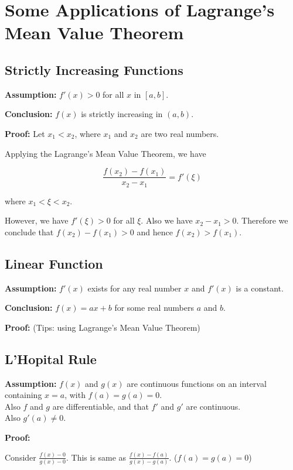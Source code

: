 \section{Some Applications of Lagrange's Mean Value Theorem}

\subsection{Strictly Increasing Functions}

\textbf{Assumption:} $f'(x) > 0$ for all $x$ in $[a, b]$.

\textbf{Conclusion:} $f(x)$ is strictly increasing in $(a, b)$.

\textbf{Proof:} Let $x_1 < x_2$, where $x_1$ and $x_2$ are two real numbers.

Applying the Lagrange's Mean Value Theorem, we have

$$ \frac{f(x_2) - f(x_1)}{x_2 - x_1} = f'(\xi) $$

where $x_1 < \xi < x_2$.

However, we have $f'(\xi) > 0$ for all $\xi$. Also we have $x_2 - x_1 > 0$. Therefore we conclude that $f(x_2) - f(x_1) > 0$ and hence $f(x_2) > f(x_1)$.

\subsection{Linear Function}

\textbf{Assumption:} $f'(x)$ exists for any real number $x$ and $f'(x)$ is a constant.

\textbf{Conclusion:} $f(x) = ax + b$ for some real numbers $a$ and $b$.

\textbf{Proof:} (Tips: using Lagrange's Mean Value Theorem)

\subsection{L'Hopital Rule}

\textbf{Assumption:} $f(x)$ and $g(x)$ are continuous functions on an interval containing $x = a$, with $f(a) = g(a) = 0$.\\
Also $f$ and $g$ are differentiable, and that $f'$ and $g'$ are continuous.\\
Also $g'(a) \not = 0$.

\textbf{Proof:}

Consider $\frac{f(x) - 0}{g(x) - 0}$. This is same as $\frac{f(x) - f(a)}{g(x) - g(a)}$. ($f(a) = g(a) = 0$)

